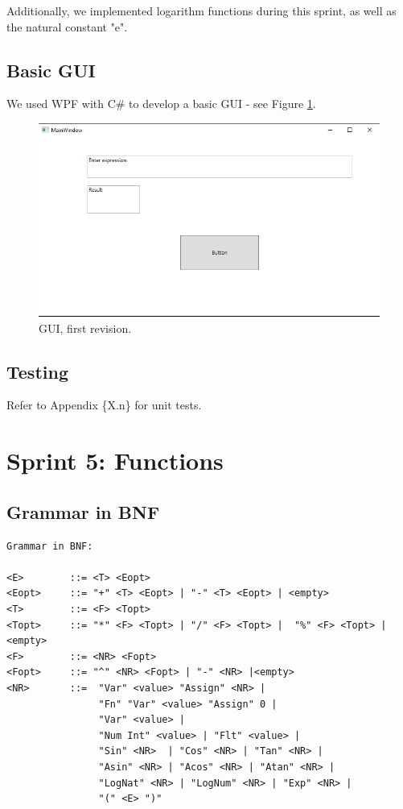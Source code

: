 \documentclass[a4paper, oneside, 11pt]{report}
\begin{document}
	Additionally, we implemented logarithm functions during this sprint, as well as the natural constant "e".

	\subsection{Basic GUI}
	We used WPF with C\# to develop a basic GUI - see Figure \ref{gui01}.
	\begin{figure}[htb]
		\begin{center}

			\includegraphics[width=0.9 \columnwidth]{GUI_01}

			\caption{GUI, first revision.}
			\label{gui01}
		\end{center}
	\end{figure}

	\subsection{Testing}
	Refer to Appendix \{X.n\} for unit tests.

	\clearpage
	\section{Sprint 5: Functions}
	\subsection{Grammar in BNF}
	\begin{verbatim}
Grammar in BNF:

<E>        ::= <T> <Eopt>
<Eopt>     ::= "+" <T> <Eopt> | "-" <T> <Eopt> | <empty>
<T>        ::= <F> <Topt>
<Topt>     ::= "*" <F> <Topt> | "/" <F> <Topt> |  "%" <F> <Topt> |<empty>
<F>        ::= <NR> <Fopt>
<Fopt>     ::= "^" <NR> <Fopt> | "-" <NR> |<empty>
<NR>       ::=  "Var" <value> "Assign" <NR> |
                "Fn" "Var" <value> "Assign" 0 |
                "Var" <value> |
                "Num Int" <value> | "Flt" <value> |
                "Sin" <NR>  | "Cos" <NR> | "Tan" <NR> |
                "Asin" <NR> | "Acos" <NR> | "Atan" <NR> |
                "LogNat" <NR> | "LogNum" <NR> | "Exp" <NR> |
                "(" <E> ")"
	\end{verbatim}
\end{document}
